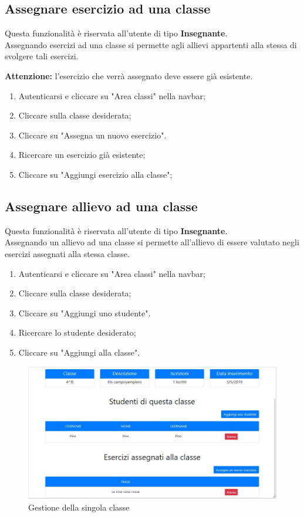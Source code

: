 \documentclass[11pt,a4paper]{article}
\begin{document}
{	\subsection{Assegnare esercizio ad una classe}
		Questa funzionalità è riservata all'utente di tipo \textbf{Insegnante}.\\
		Assegnando esercizi ad una classe si permette agli allievi appartenti alla stessa di svolgere tali esercizi.
		
		\noindent \textbf{Attenzione:} l'esercizio che verrà assegnato deve essere già esistente.
		
		\begin{enumerate}
			\item Autenticarsi e cliccare su "Area classi" nella navbar;
			\item Cliccare sulla classe desiderata;
			\item Cliccare su "Assegna un nuovo esercizio".
			\item Ricercare un esercizio già esistente;
			\item Cliccare su "Aggiungi esercizio alla classe";
		\end{enumerate}
		
		\subsection{Assegnare allievo ad una classe}
		Questa funzionalità è riservata all'utente di tipo \textbf{Insegnante}.\\
		Assegnando un allievo ad una classe si permette all'allievo di essere valutato negli esercizi assegnati alla stessa classe.
		
		\begin{enumerate}
			\item Autenticarsi e cliccare su "Area classi" nella navbar;
			\item Cliccare sulla classe desiderata;
			\item Cliccare su "Aggiungi uno studente".
			\item Ricercare lo studente desiderato;
			\item Cliccare su "Aggiungi alla classe".
		\end{enumerate}
	
		\begin{figure}[h!]
		\centering
		\includegraphics[scale=0.65]{images/gestioneclasse.jpg}
		\caption{Gestione della singola classe}
	\end{figure}
			
}
\end{document}
